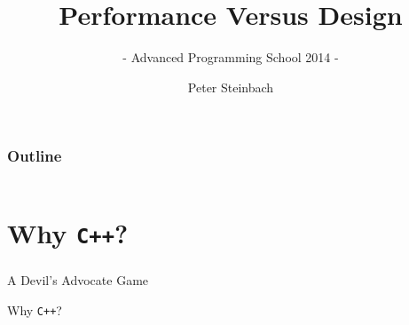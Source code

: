 \documentclass[9pt,xcolor=table]{beamer}
\def\cpp{\texttt{C++}}
\begin{document}
     
 
 
\title[PerfVsDesign]{Performance Versus Design}
\subtitle{- Advanced Programming School 2014 -}
\author[P. Steinbach]{Peter Steinbach}
\date{}
\addtocounter{framenumber}{-1}
\renewcommand*\inserttotalframenumber{XX} 

 
{
\maketitle
}

\begin{frame}[t]
\frametitle{Outline}
\vspace{-1.5\baselineskip}
\begin{columns}[t]
  \begin{column}{.1\textwidth}
    \hfill
  \end{column}
  \begin{column}{.75\textwidth}
    \huge
    \tableofcontents[hideallsubsections]
  \end{column}
  \begin{column}{.1\textwidth}
    \hfill
  \end{column}
\end{columns}
\end{frame}

\section[Why \cpp{}?]{Why \cpp{}?}
\begin{frame}
\frametitle{\insertsection{}}
\begin{block}{A Devil's Advocate Game}
  \Huge
  \begin{center}
    Why \cpp{}?
  \end{center}
\end{block}
\end{frame}
\end{document}
